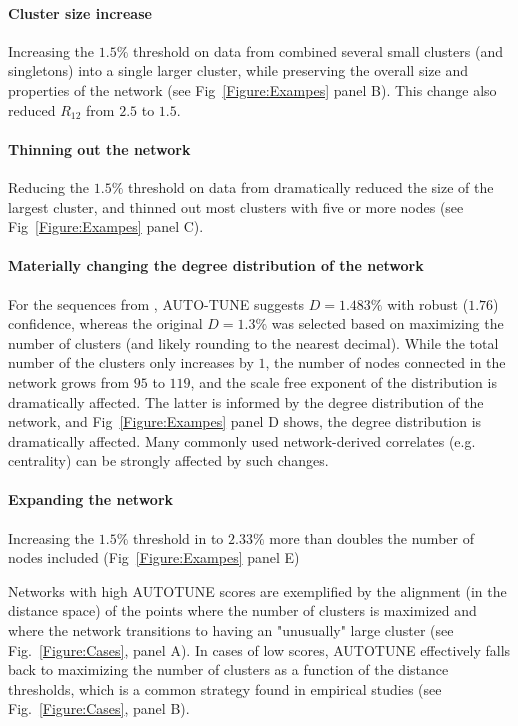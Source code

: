 \documentclass[utf8]{FrontiersinHarvard} %
\begin{document}
\paragraph{Cluster size increase}  Increasing the $1.5\%$ threshold on data
from \citet{Little:2014aa} combined several small clusters (and singletons)
into a single larger cluster, while preserving the overall size and properties
of the network (see Fig~\ref{Figure:Exampes} panel B). This change also reduced
$R_{12}$ from $2.5$ to $1.5$.

\paragraph{Thinning out the network}  Reducing the $1.5\%$ threshold on data
from \citet{rhee_national_2019} dramatically reduced the size of the largest
cluster, and thinned out most clusters with five or more nodes (see
Fig~\ref{Figure:Exampes} panel C).

\paragraph{Materially changing the degree distribution of the network}  For the
sequences from \citet{Li:2022aa}, AUTO-TUNE suggests $D = 1.483\%$ with robust
($1.76$) confidence, whereas the original $D=1.3\%$ was selected based on
maximizing the number of clusters (and likely rounding to the nearest decimal).
While the total number of the clusters only increases by $1$, the number of
nodes connected in the network grows from $95$ to $119$, and the scale free
exponent of the distribution is dramatically affected. The latter is informed
by the degree distribution of the network, and Fig~\ref{Figure:Exampes} panel D
shows, the degree distribution is dramatically affected. Many commonly used
network-derived correlates (e.g. centrality) can be strongly affected by such
changes.

\paragraph{Expanding the network}  Increasing the $1.5\%$ threshold in
\citet{Billings:2019aa} to $2.33\%$ more than doubles the number of nodes
included (Fig~\ref{Figure:Exampes} panel E)

Networks with high AUTOTUNE scores are exemplified by the alignment (in the
distance space) of the points where the number of clusters is maximized and
where the network transitions to having an "unusually" large cluster (see
Fig.~\ref{Figure:Cases}, panel A). In cases of low scores, AUTOTUNE effectively
falls back to maximizing the number of clusters as a function of the distance
thresholds, which is a common strategy found in empirical studies (see
Fig.~\ref{Figure:Cases}, panel B). 
\end{document}
